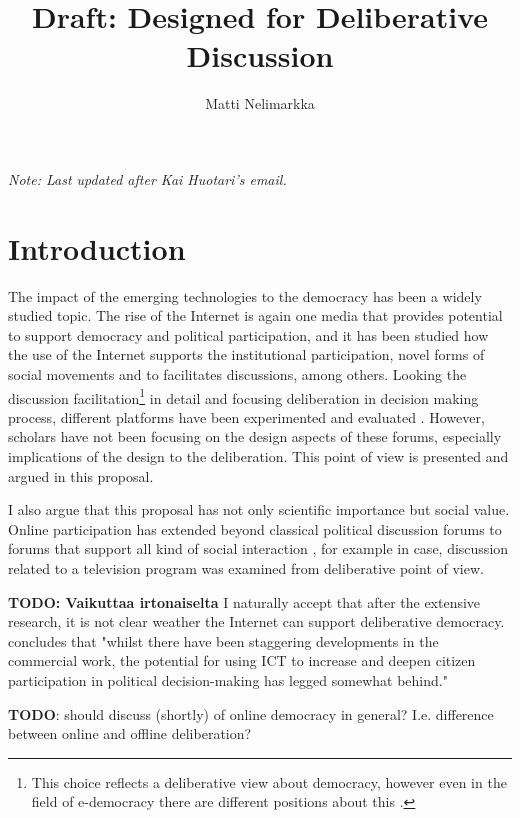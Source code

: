 \documentclass[journal,a4paper]{IEEEtran}
\author{Matti Nelimarkka}
\title{Draft: Designed for Deliberative Discussion}
\begin{document}
\maketitle

\setlength{\parindent}{0pt}
\setlength{\parskip}{1ex}

\textit{Note: Last updated after Kai Huotari's email.}

\section{Introduction}

The impact of the emerging technologies to the democracy has been a widely studied topic. The rise of the Internet is again one media that provides potential to support democracy and political participation, and it has been studied how the use of the Internet supports the institutional participation, novel forms of social movements and to facilitates discussions, among others. Looking the discussion facilitation\footnote{This choice reflects a deliberative view about democracy, however even in the field of e-democracy there are different positions about this .} in detail and focusing deliberation in decision making process, different platforms have been experimented  and evaluated . However, scholars have not been focusing on the design aspects of these forums, especially implications of the design to the deliberation. This point of view is presented and argued in this proposal.

I also argue that this proposal has not only scientific importance but social value. Online participation has extended beyond classical political discussion forums to forums that support all kind of social interaction \cite{graham12}, for example in  case, discussion related to a television program was examined from deliberative point of view.

\textbf{TODO: Vaikuttaa irtonaiselta} I naturally accept that after the extensive research, it is not clear weather the Internet can support deliberative democracy.  concludes that "whilst there have been staggering developments in the commercial work, the potential for using ICT to increase and deepen citizen participation in political decision-making has legged somewhat behind."

\textbf{TODO}: should discuss (shortly) of online democracy in general? I.e. difference between online and offline deliberation?
\end{document}
